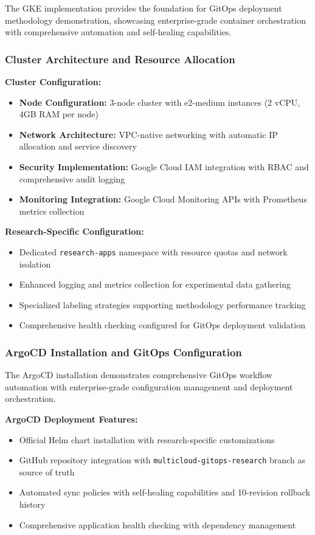 The GKE implementation provides the foundation for GitOps deployment methodology demonstration, showcasing enterprise-grade container orchestration with comprehensive automation and self-healing capabilities.

\subsubsection{Cluster Architecture and Resource Allocation}

\textbf{Cluster Configuration:}
\begin{itemize}
\item \textbf{Node Configuration:} 3-node cluster with e2-medium instances (2 vCPU, 4GB RAM per node)
\item \textbf{Network Architecture:} VPC-native networking with automatic IP allocation and service discovery
\item \textbf{Security Implementation:} Google Cloud IAM integration with RBAC and comprehensive audit logging
\item \textbf{Monitoring Integration:} Google Cloud Monitoring APIs with Prometheus metrics collection
\end{itemize}

\textbf{Research-Specific Configuration:}
\begin{itemize}
\item Dedicated \texttt{research-apps} namespace with resource quotas and network isolation
\item Enhanced logging and metrics collection for experimental data gathering
\item Specialized labeling strategies supporting methodology performance tracking
\item Comprehensive health checking configured for GitOps deployment validation
\end{itemize}

\subsubsection{ArgoCD Installation and GitOps Configuration}

The ArgoCD installation demonstrates comprehensive GitOps workflow automation with enterprise-grade configuration management and deployment orchestration.

\textbf{ArgoCD Deployment Features:}
\begin{itemize}
\item Official Helm chart installation with research-specific customizations
\item GitHub repository integration with \texttt{multicloud-gitops-research} branch as source of truth
\item Automated sync policies with self-healing capabilities and 10-revision rollback history
\item Comprehensive application health checking with dependency management
\end{itemize}

